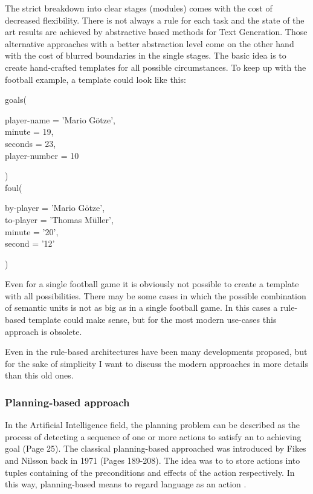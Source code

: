 The strict breakdown into clear stages (modules) comes with the cost of decreased flexibility. There is not always a rule for each task and the state of the art results are achieved by abstractive based methods for Text Generation. Those alternative approaches with a better abstraction level come on the other hand with the cost of blurred boundaries in the single stages. The basic idea is to create hand-crafted templates for all possible circumstances. To keep up with the football example, a template could look like this:

\begin{tcolorbox}
	goals(
		\begin{addmargin}[1cm]{1cm}
			player-name = 'Mario Götze',\\
			minute = 19,\\
			seconds = 23,\\
			player-number = 10
		\end{addmargin}
		
	)\\
	
	foul(
		\begin{addmargin}[1cm]{1cm}
			by-player = 'Mario Götze',\\
			to-player = 'Thomas Müller',\\
			minute = '20',\\
			second = '12'
		\end{addmargin}
	)
\end{tcolorbox}

Even for a single football game it is obviously not possible to create a template with all possibilities. There may be some cases in which the possible combination of semantic units is not as big as in a single football game. In this cases a rule-based template could make sense, but for the most modern use-cases this approach is obsolete.

Even in the rule-based architectures have been many developments proposed, but for the sake of simplicity I want to discuss the modern approaches in more details than this old ones.

\subsubsection{Planning-based approach}

In the Artificial Intelligence field, the planning problem can be described as the process of detecting a sequence of one or more actions to satisfy an to achieving goal \cite{gatt} (Page 25). The classical planning-based approached was introduced by Fikes and Nilsson back in 1971 \cite{Fikes:71} (Pages 189-208). The idea was to to store actions into tuples containing of the preconditions and effects of the action respectively. In this way, planning-based means to regard language as an action \cite{clark}. 

